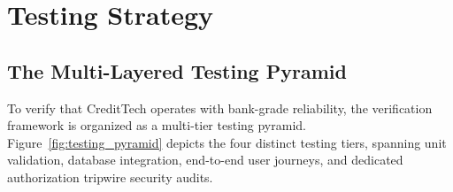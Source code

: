 \documentclass[11pt,a4paper,oneside]{report}
\begin{document}



\chapter{Testing Strategy}
\label{chap:testing_strategy}

\section{The Multi-Layered Testing Pyramid}
To verify that CreditTech operates with bank-grade reliability, the verification framework is organized as a multi-tier testing pyramid. Figure~\ref{fig:testing_pyramid} depicts the four distinct testing tiers, spanning unit validation, database integration, end-to-end user journeys, and dedicated authorization tripwire security audits.
\end{document}
